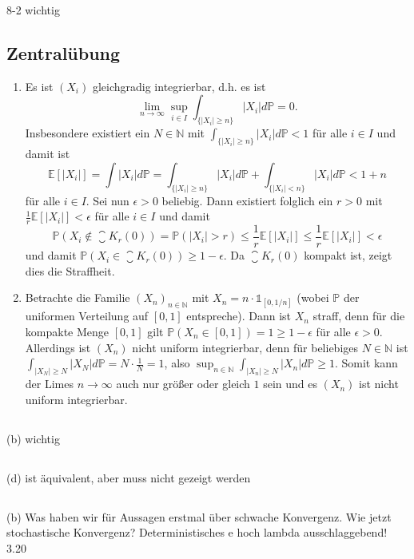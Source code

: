 \documentclass[a4paper]{article}
\begin{document}
8-2 wichtig

\makeexheader

\subsection{Zentralübung}


\begin{enumerate}
    \item Es ist $(X_i)$ gleichgradig integrierbar, d.h. es ist 
    \begin{equation*}
        \lim_{n \to \infty} \sup_{i \in I} \int_{\{|X_i| \geq n\}} |X_i| d \mathds{P} = 0\text{.}
    \end{equation*}
    Insbesondere existiert ein $N \in \mathds{N}$ mit $\int_{\{|X_i| \geq n\}} |X_i| d \mathds{P} < 1$ für alle $i \in I$ und damit ist
    \begin{equation*}
        \mathds{E}[|X_i|] = \int |X_i| d \mathds{P} = \int_{\{|X_i| \geq n\}} |X_i| d \mathds{P} + \int_{\{|X_i| < n\}} |X_i| d\mathds{P} < 1 + n 
    \end{equation*}
    für alle $i \in I$. Sei nun $\epsilon > 0$ beliebig.
    Dann existiert folglich ein $r > 0$ mit $\frac{1}{r} \mathds{E}[|X_i|] < \epsilon$ für alle $i \in I$ und damit
    \begin{equation*}
        \mathds{P}(X_i \notin \closure{K_r(0)}) = \mathds{P}(|X_i| > r) \leq \frac{1}{r} \mathds{E}[|X_i|] \leq \frac{1}{r} \mathds{E}[|X_i|] < \epsilon
    \end{equation*}
    und damit $\mathds{P}(X_i \in \closure{K_r(0)}) \geq 1 - \epsilon$. Da $\closure{K_r(0)}$ kompakt ist, zeigt dies die Straffheit.
    \item Betrachte die Familie $(X_n)_{n \in \mathds{N}}$ mit $X_n = n \cdot \mathds{1}_{[0, 1/n]}$ (wobei $\mathds{P}$ der uniformen Verteilung auf $[0,1]$ entspreche). 
    Dann ist $X_n$ straff, denn für die kompakte Menge $[0,1]$ gilt $\mathds{P}(X_n \in [0,1]) = 1 \geq 1 - \epsilon$ für alle $\epsilon > 0$. 
    Allerdings ist $(X_n)$ nicht uniform integrierbar, denn für beliebiges $N \in \mathds{N}$ ist $\int_{|X_{N}| \geq N} |X_N| d \mathds{P} = N \cdot \frac{1}{N} = 1$, also $\sup_{n \in \mathds{N}}  \int_{|X_{n}| \geq N} |X_n| d \mathds{P} \geq 1$.
    Somit kann der Limes $n \to \infty$ auch nur größer oder gleich $1$ sein und es $(X_n)$ ist nicht uniform integrierbar.
\end{enumerate}


\subsection{}

(b) wichtig

\subsection{}

(d) ist äquivalent, aber muss nicht gezeigt werden

\subsection{}

(b) Was haben wir für Aussagen erstmal über schwache Konvergenz. Wie jetzt stochastische Konvergenz? Deterministisches e hoch lambda ausschlaggebend! 3.20
\end{document}
